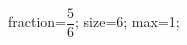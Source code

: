 \documentclass[exercice]{thedocument}%
\begin{document}
%
\>fraction=$\dfrac56$;%
\>size=6;%
\>max=1;%
%
\end{document}
